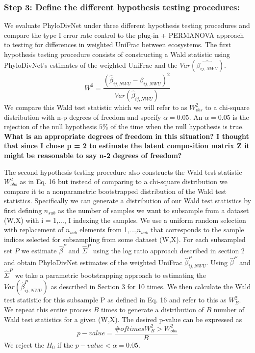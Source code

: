 \documentclass{article}
\begin{document}
\subsubsection{\textbf{Step 3: Define the different hypothesis testing procedures:}}

We evaluate PhyloDivNet under three different hypothesis testing procedures and compare the type I error rate control to the plug-in + PERMANOVA approach to testing for differences in weighted UniFrac between ecosystems. The first hypothesis testing procedure consists of constructing a Wald statistic using PhyloDivNet's estimates of the weighted UniFrac and the $Var(\hat{\beta_{ij,NWU}})$.
\begin{equation}
  W^2 = \frac{(\hat{\beta}_{ij,NWU} - \beta_{ij,NWU})^2}{Var(\hat{\beta}_{ij,NWU})}
\end{equation}
We compare this Wald test statistic which we will refer to as $W_{obs}^{2}$ to a chi-square distribution with n-p degrees of freedom and specify $\alpha = 0.05$. An $\alpha = 0.05$ is the rejection of the null hypothesis $5\%$ of the time when the null hypothesis is true. \textbf{What is an appropriate degrees of freedom in this situation? I thought that since I chose p = 2 to estimate the latent composition matrix Z it might be reasonable to say n-2 degrees of freedom?}

The second hypothesis testing procedure also constructs the Wald test statistic $W_{obs}^{2}$ as in Eq. 16 but instead of comparing to a chi-square distribution we compare it to a nonparametric bootstrapped distribution of the Wald test statistics. Specifically we can generate a distribution of our Wald test statistics by first defining $n_{sub}$ as the number of samples we want to subsample from a dataset (W,X) with i = 1,..., I indexing the samples. We use a uniform random selection with replacement of $n_{sub}$ elements from 1,...,$n_{sub}$ that corresponds to the sample indices selected for subsampling from some dataset (W,X). For each subsampled set $P$ we estimate $\hat{\beta}^P$ and $\hat{\Sigma}^P$ using the log ratio approach described in section 2 and obtain PhyloDivNet estimates of the weighted UniFrac $\hat{\beta}_{ij,NWU}^P$. Using $\hat{\beta}^P$ and $\hat{\Sigma}^P$ we take a parametric bootstrapping approach to estimating the $Var(\hat{\beta}_{ij,NWU}^P)$ as described in Section 3 for 10 times. We then calculate the Wald test statistic for this subsample P as defined in Eq. 16 and refer to this as $W_{B}^{2}$. We repeat this entire process $B$ times to generate a distribution of $B$ number of Wald test statistics for a given (W,X). The desired p-value can be expressed as
\begin{equation}
  p-value = \frac{\# of times W_{B}^2 > W_{obs}^{2}}{B}
\end{equation}
We reject the $H_0$ if the $p-value < \alpha = 0.05$.
\end{document}
